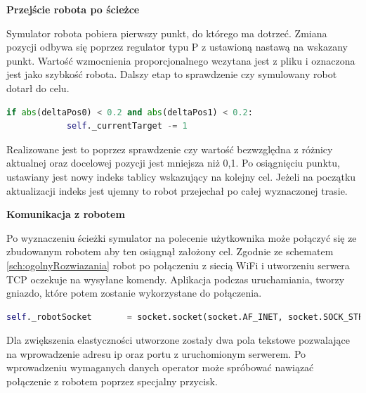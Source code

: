 \textbf{Przejście robota po ścieżce}

Symulator robota pobiera pierwszy punkt, do którego ma dotrzeć. Zmiana pozycji odbywa się poprzez regulator typu P z 
ustawioną nastawą na wskazany punkt. Wartość wzmocnienia proporcjonalnego wczytana jest z pliku i oznaczona jest jako szybkość robota.
Dalszy etap to sprawdzenie czy symulowany robot dotarł do celu. 
\begin{lstlisting}[language=Python,caption=Uruchomienie aplikacji,label={kodPythonSprawdzenieCeluRobota}]
if abs(deltaPos0) < 0.2 and abs(deltaPos1) < 0.2:
            self._currentTarget -= 1
\end{lstlisting}
Realizowane jest to poprzez sprawdzenie czy wartość bezwzględna z różnicy aktualnej oraz docelowej pozycji jest mniejsza niż 0,1.
Po osiągnięciu punktu, ustawiany jest nowy indeks tablicy wskazujący na kolejny cel.
Jeżeli na początku aktualizacji indeks jest ujemny to robot przejechał po całej wyznaczonej trasie.

\textbf{Komunikacja z robotem}

Po wyznaczeniu ścieżki symulator na polecenie użytkownika może połączyć się ze zbudowanym robotem aby ten osiągnął założony cel.
Zgodnie ze schematem \ref{sch:ogolnyRozwiazania} robot po połączeniu z siecią WiFi i utworzeniu serwera TCP oczekuje na wysyłane komendy.
Aplikacja podczas uruchamiania, tworzy gniazdo, które potem zostanie wykorzystane do połączenia. 
\begin{lstlisting}[language=Python,caption=Utworzone gniazdo,label={kodPythonGniazdo}]
self._robotSocket       = socket.socket(socket.AF_INET, socket.SOCK_STREAM)
\end{lstlisting}
Dla zwiększenia elastyczności utworzone zostały dwa pola tekstowe pozwalające na wprowadzenie adresu ip oraz portu z uruchomionym serwerem.
Po wprowadzeniu wymaganych danych operator może spróbować nawiązać połączenie z robotem poprzez specjalny przycisk.


